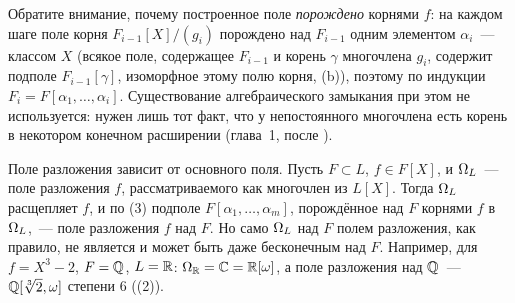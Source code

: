 \par\noindent\begin{minipage}{\linewidth}
\begin{center}
\end{center}
\end{minipage}\par\medskip

Обратите внимание, почему построенное поле \emph{порождено} корнями $f$: на каждом шаге поле корня $F_{i-1}[X]/(g_i)$
порождено над $F_{i-1}$ одним элементом $\alpha_i$~--- классом $X$ (всякое поле, содержащее $F_{i-1}$ и корень $\gamma$
многочлена $g_i$, содержит подполе $F_{i-1}[\gamma]$, изоморфное этому полю корня, (b)), поэтому
по индукции $F_i=F[\alpha_1,\dots,\alpha_i]$. Существование алгебраического замыкания при этом не используется: нужен лишь
тот факт, что у непостоянного многочлена есть корень в некотором конечном расширении (глава~1, после ).

\begin{remark}[2.7a]
Поле разложения зависит от основного поля. Пусть $F\subset L$, $f\in F[X]$, и $\Omega_L$~--- поле разложения $f$,
рассматриваемого как многочлен из $L[X]$. Тогда $\Omega_L$ расщепляет $f$, и по (3) подполе $F[\alpha_1,\dots,\alpha_m]$,
порождённое над $F$ корнями $f$ в $\Omega_L$,~--- поле разложения $f$ над $F$. Но само $\Omega_L$ над $F$ полем разложения, как
правило, не является и может быть даже бесконечным над $F$. Например, для $f=X^3-2$, $F=\mathbb Q$, $L=\mathbb R$: $\Omega_\mathbb R=\mathbb C=\mathbb R[\omega]$,
а поле разложения над $\mathbb Q$~--- $\mathbb Q[\sqrt[3]2,\omega]$ степени $6$ ((2)).
\end{remark}

